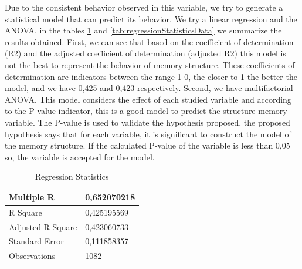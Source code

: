 Due to the consistent behavior observed in this variable, we try to generate a statistical model that can predict its behavior. We try a linear regression and the ANOVA, in the tables \ref {tab:regressionStatistics} and \ref {tab:regressionStatisticsData} we summarize the results obtained. First, we can see that based on the coefficient of determination (R2) and the adjusted coefficient of determination (adjusted R2) this model is not the best to represent the behavior of memory structure. These coefficients of determination are indicators between the range 1-0, the closer to 1 the better the model, and we have 0,425 and 0,423 respectively. Second, we have multifactorial ANOVA. This model considers the effect of each studied variable and according to the P-value indicator, this is a good model to predict the structure memory variable. The P-value is used to validate the hypothesis proposed, the proposed hypothesis says that for each variable, it is significant to construct the model of the memory structure. If the calculated P-value of the variable is less than 0,05 so, the variable is accepted for the model.

\begin{table}[H]
	\centering
	\caption{Regression Statistics}
	\label{tab:regressionStatistics}
	\begin{tabular}{|l|l|}
		\hline
		Multiple R & 0,652070218 \\ \hline
		R Square & 0,425195569 \\ \hline
		Adjusted R Square & 0,423060733 \\ \hline
		Standard Error & 0,111858357 \\ \hline
		Observations & 1082 \\ \hline
	\end{tabular}
\end{table}

